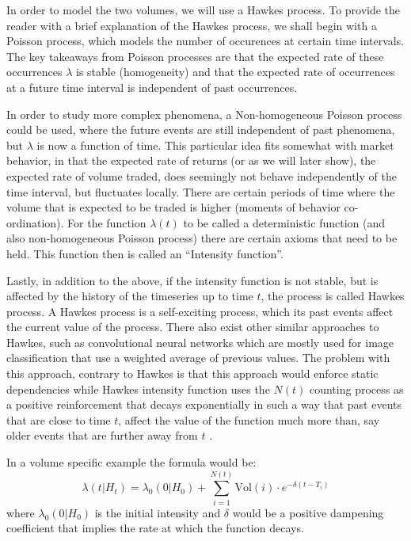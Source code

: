 In order to model the two volumes, we will use a Hawkes process. To provide the reader with a brief explanation of the Hawkes process, we shall begin with a Poisson process, which models the number of occurences at certain time intervals. The key takeaways from Poisson processes are that the expected rate of these occurrences \( \lambda \) is stable (homogeneity) and that the expected rate of occurrences at a future time interval is independent of past occurrences. 

In order to study more complex phenomena, a Non-homogeneous Poisson process could be used, where the future events are still independent of past phenomena, but \( \lambda \) is now a function of time. This particular idea fits somewhat with market behavior, in that the expected rate of returns (or as we will later show), the expected rate of volume traded, does seemingly not behave independently of the time interval, but fluctuates locally. There are certain periods of time where the volume that is expected to be traded is higher (moments of behavior co-ordination). For the function \( \lambda(t) \) to be called a deterministic function (and also non-homogeneous Poisson process) there are certain axioms that need to be held. This function then is called an “Intensity function”.

Lastly, in addition to the above, if the intensity function is not stable, but is affected by the history of the timeseries up to time \(t\), the process is called Hawkes process. A Hawkes process is a self-exciting process, which its past events affect the current value of the process. There also exist other similar approaches to Hawkes, such as convolutional neural networks which are mostly used for image classification that use a weighted average of previous values. The problem with this approach, contrary to Hawkes is that this approach would enforce static dependencies while Hawkes intensity function uses the \(N(t)\) counting process as a positive reinforcement that decays exponentially in such a way that past events that are close to time \(t\), affect the value of the function much more than, say older events that are further away from \(t\) \cite{hawkes2}. 

In a volume specific example the formula would be:
\[ \lambda(t|H_t) = \lambda_0(0|H_0) + \sum_{i=1}^{N(t)}\text{Vol}(i) \cdot e^{-\delta(t-T_i)} \]
where \(\lambda_0(0|H_0) \) is the initial intensity and \( \delta \) would be a positive dampening coefficient that implies the rate at which the function decays.

